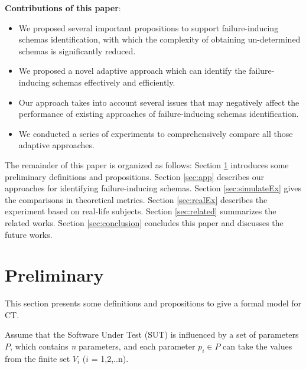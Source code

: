 \documentclass{sig-alternate-05-2015}
\begin{document}
\textbf{Contributions of this paper}:
\begin{itemize}
  \item We proposed several important propositions to support failure-inducing schemas identification, with which the complexity of obtaining un-determined schemas is significantly reduced.

  \item We proposed a novel adaptive approach which can identify the failure-inducing schemas effectively and efficiently.
  \item Our approach takes into account several issues that may negatively affect the performance of existing approaches of failure-inducing schemas identification.

  \item We conducted a series of experiments to comprehensively compare all those adaptive approaches.

\end{itemize}

The remainder of this paper is organized as follows: Section \ref{sec:back} introduces some preliminary definitions and propositions.
 Section \ref{sec:app} describes our approaches for identifying failure-inducing schemas. Section \ref{sec:simulateEx} gives the comparisons in theoretical metrics. Section \ref{sec:realEx} describes the experiment based on real-life subjects. Section \ref{sec:related} summarizes the related works. Section \ref{sec:conclusion} concludes this paper and discusses the future works.

\section{Preliminary}\label{sec:back}
This section presents some definitions and propositions to give a formal model for CT.


Assume that the Software Under Test (SUT) is influenced by a set of parameters $P$, which contains \emph{n} parameters, and each parameter $p_{i} \in P$ can take the values from the finite set $V_{i}$ ($i$ = 1,2,..n).
\end{document}
